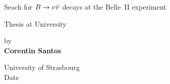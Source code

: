 \thispagestyle{empty}
\begin{center}
\huge{Seach for $B \to \nu \Bar{\nu}$ decays at the Belle~II experiment}

\vspace{0.2\textheight}
\large{Thesis at University}

\vspace{0.2\textheight}
\large{by \\ \textbf{Corentin Santos}}

\vspace{0.1\textheight}
\large{University of Strasbourg \\ Date}
\end{center}

\newpage
\thispagestyle{empty}
